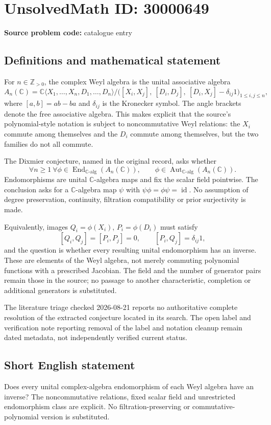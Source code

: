 \documentclass[11pt]{article}
\newcommand{\Z}{\mathbb{Z}}
\newcommand{\C}{\mathbb{C}}
\begin{document}
\section*{UnsolvedMath ID: 30000649}
\textbf{Source problem code:} catalogue entry
\subsection{Definitions and mathematical statement}
For \(n\in\Z_{>0}\), the complex Weyl algebra is the unital associative algebra
\[
 A_n(\C)=\C\langle X_1,\ldots,X_n,D_1,\ldots,D_n\rangle
 \big/\bigl([X_i,X_j],\ [D_i,D_j],\ [D_i,X_j]-\delta_{ij}1\bigr)_{1\leq i,j\leq n},
\]
where \([a,b]=ab-ba\) and \(\delta_{ij}\) is the Kronecker symbol. The angle brackets denote the free associative algebra. This makes explicit that the source's polynomial-style notation is subject to noncommutative Weyl relations: the \(X_i\) commute among themselves and the \(D_i\) commute among themselves, but the two families do not all commute.

The Dixmier conjecture, named in the original record, asks whether
\[
 \forall n\geq1\ \forall\phi\in\operatorname{End}_{\C\text{-}\mathrm{alg}}(A_n(\C)),
 \qquad \phi\in\operatorname{Aut}_{\C\text{-}\mathrm{alg}}(A_n(\C)).
\]
Endomorphisms are unital \(\C\)-algebra maps and fix the scalar field pointwise. The conclusion asks for a \(\C\)-algebra map \(\psi\) with \(\psi\phi=\phi\psi=\operatorname{id}\). No assumption of degree preservation, continuity, filtration compatibility or prior surjectivity is made.

Equivalently, images \(Q_i=\phi(X_i)\), \(P_i=\phi(D_i)\) must satisfy
\[
 [Q_i,Q_j]=[P_i,P_j]=0,\qquad [P_i,Q_j]=\delta_{ij}1,
\]
and the question is whether every resulting unital endomorphism has an inverse. These are elements of the Weyl algebra, not merely commuting polynomial functions with a prescribed Jacobian. The field and the number of generator pairs remain those in the source; no passage to another characteristic, completion or additional generators is substituted.

The literature triage checked 2026-08-21 reports no authoritative complete resolution of the extracted conjecture located in its search. The open label and verification note reporting removal of the label and notation cleanup remain dated metadata, not independently verified current status.
\subsection{Short English statement}
Does every unital complex-algebra endomorphism of each Weyl algebra have an inverse? The noncommutative relations, fixed scalar field and unrestricted endomorphism class are explicit. No filtration-preserving or commutative-polynomial version is substituted.
\end{document}
